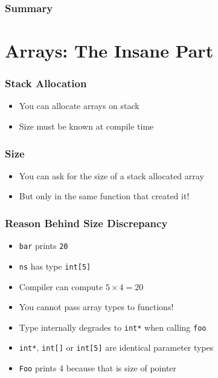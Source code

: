 \begin{frame}
  \frametitle{Summary}
\end{frame}

\section{Arrays: The Insane Part}

\frame{\tableofcontents[currentsection]}

\begin{frame}
  \frametitle{Stack Allocation}
  \begin{itemize}
    \item You can allocate arrays on stack
    \item Size must be known at compile time
  \end{itemize}
\end{frame}

\begin{frame}
  \frametitle{Size}
  \begin{itemize}
    \item You can ask for the size of a stack allocated array
    \item But only in the same function that created it!
  \end{itemize}
\end{frame}

\begin{frame}
  \frametitle{Reason Behind Size Discrepancy}
  \begin{itemize}
    \item \texttt{bar} prints \texttt{20}
    \item \texttt{ns} has type \texttt{int[5]}
    \item Compiler can compute $5 \times 4 = 20$
  \end{itemize}
  \vskip5mm
  \begin{itemize}
    \item You cannot pass array types to functions!
    \item Type internally degrades to \texttt{int*} when calling \texttt{foo}
    \item \texttt{int*}, \texttt{int[]} or \texttt{int[5]} are identical parameter types
    \item \texttt{Foo} prints 4 because that is size of pointer
  \end{itemize}
\end{frame}

